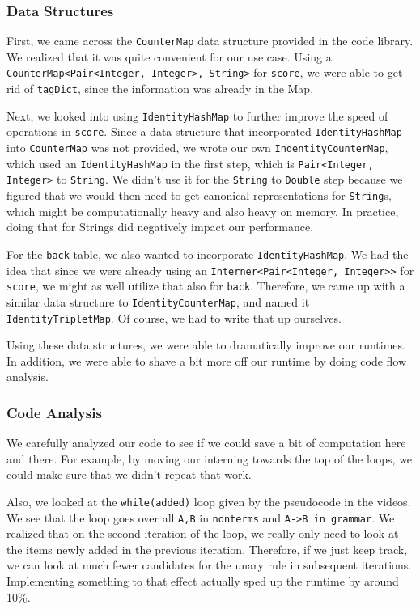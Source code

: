 \documentclass[12pt]{article}
\begin{document}
\subsubsection{Data Structures}
First, we came across the \texttt{CounterMap} data structure provided in the code library. We realized that it was quite convenient for our use case. Using a \texttt{CounterMap<Pair<Integer, Integer>, String>} for \texttt{score}, we were able to get rid of \texttt{tagDict}, since the information was already in the Map.

Next, we looked into using \texttt{IdentityHashMap} to further improve the speed of operations in \texttt{score}. Since a data structure that incorporated \texttt{IdentityHashMap} into \texttt{CounterMap} was not provided, we wrote our own \texttt{IndentityCounterMap}, which used an \texttt{IdentityHashMap} in the first step, which is \texttt{Pair<Integer, Integer>} to \texttt{String}. We didn't use it for the \texttt{String} to \texttt{Double} step because we figured that we would then need to get canonical representations for \texttt{String}s, which might be computationally heavy and also heavy on memory. In practice, doing that for Strings did negatively impact our performance.

For the \texttt{back} table, we also wanted to incorporate \texttt{IdentityHashMap}. We had the idea that since we were already using an \texttt{Interner<Pair<Integer, Integer>>} for \texttt{score}, we might as well utilize that also for \texttt{back}. Therefore, we came up with a similar data structure to \texttt{IdentityCounterMap}, and named it \texttt{IdentityTripletMap}. Of course, we had to write that up ourselves.

Using these data structures, we were able to dramatically improve our runtimes. In addition, we were able to shave a bit more off our runtime by doing code flow analysis.
\subsubsection{Code Analysis}
We carefully analyzed our code to see if we could save a bit of computation here and there. For example, by moving our interning towards the top of the loops, we could make sure that we didn't repeat that work.

Also, we looked at the \texttt{while(added)} loop given by the pseudocode in the videos. We see that the loop goes over all \texttt{A,B} in \texttt{nonterms} and \texttt{A->B in grammar}. We realized that on the second iteration of the loop, we really only need to look at the items newly added in the previous iteration. Therefore, if we just keep track, we can look at much fewer candidates for the unary rule in subsequent iterations. Implementing something to that effect actually sped up the runtime by around 10\%.
\end{document}
